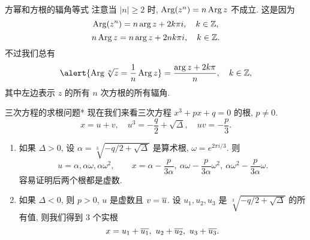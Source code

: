 


\begin{frame}{方幂和方根的辐角等式}
\onslide<+->
注意当 $|n|\ge 2$ 时, \alert{$\operatorname{Arg}(z^n)=n\operatorname{Arg} z$ 不成立}.
\onslide<+->
这是因为
\[\operatorname{Arg}(z^n)=n\arg z+2k\pi i,\quad k\in{\mathbb{Z}},\]
\[n\operatorname{Arg} z=n\arg z+2nk\pi i,\quad k\in{\mathbb{Z}}.\]
\onslide<+->
不过我们总有
\[\alert{\Arg \sqrt[n]z=\dfrac1n\Arg z}=\dfrac{\arg z+2k\pi}n,\quad k\in\BZ,\]
\onslide<+->
其中左边表示 $z$ 的所有 $n$ 次方根的所有辐角.
\end{frame}
	

\begin{frame}{三次方程的求根问题*}
\onslide<+->
现在我们来看三次方程 $x^3+px+q=0$ 的根, $p\neq 0$.
\onslide<+->
\[x=u+v,\quad u^3=-\frac q2+\sqrt{\Delta},\quad uv=-\frac p3.\]
\begin{enumerate}
\item 如果 $\Delta>0$, 设 $\alpha=\sqrt[3]{-q/2+\sqrt{\Delta}}$ 是算术根, $\omega=e^{2\pi i/3}$.
\onslide<+->
则
\[u=\alpha,\alpha\omega,\alpha\omega^2,\qquad
x=\alpha-\frac p{3\alpha},\ \alpha\omega-\frac p{3\alpha} \omega^2,\ \alpha\omega^2-\frac p{3\alpha} \omega.\]
\onslide<+->
容易证明后两个根都是虚数.
\item 如果 $\Delta<0$, 则 $p>0$, $u$ 是虚数且 $v=\overline u$.
\onslide<+->设 $u_1,u_2,u_3$ 是 $\sqrt[3]{-q/2+\sqrt{\Delta}}$ 的所有值,
\onslide<+->
则我们得到 $3$ 个实根
\[x=u_1+\ov{u_1},\ u_2+\ov{u_2},\ u_3+\ov{u_3}.\]
\end{enumerate}
\end{frame}

